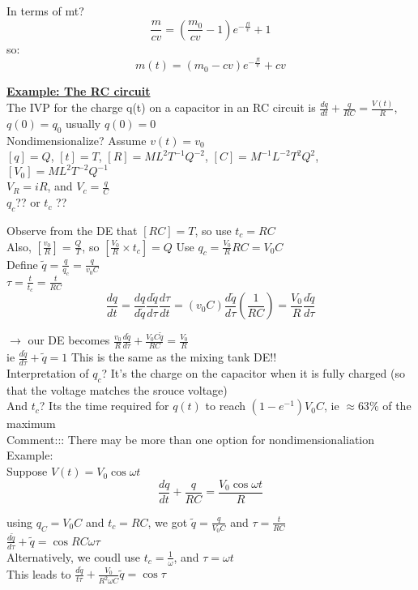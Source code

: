\documentclass[12pt]{article}
\newcommand{\myt}[1]{\textbf{\underline{#1}}}
\begin{document}
	In terms of mt?\\
	$$\frac{m}{cv} = (\frac{m_0}{cv} - 1)e^{-\frac{ft}{v}} + 1$$
	so:\\
	$$m(t) = (m_0 - cv)e^{-\frac{ft}{v}} + cv$$
	
	\myt{Example: The RC circuit}\\
	The IVP for the charge q(t) on a capacitor in an RC circuit is $\frac{dq}{dt} + \frac{q}{RC} = \frac{V(t)}{R}$, $q(0) = q_0$ usually $q(0) = 0$\\
	Nondimensionalize? Assume $v(t) = v_0$\\
	$[q] = Q$, $[t] = T$, $[R] = ML^2T^{-1}Q^{-2}$, $[C] = M^{-1}L^{-2}T^2Q^2$, $[V_0] = ML^{2}T^{-2}Q^{-1}$\\
	$V_R = iR$, and $V_c = \frac{q}{C}$\\
	
	$q_c$?? or $t_c$ ??
	
	Observe from the DE that $[RC] = T$, so use $t_c = RC$\\
	Also, $[\frac{v_0}{R}] = \frac{Q}{T}$, so $[\frac{V_0}{R} \times t_c] = Q$ Use $q_c = \frac{V_0}{R}RC = V_0C$\\
	Define $\tilde{q} = \frac{q}{q_c} = \frac{q}{v_0C}$\\
	$\tau = \frac{t}{t_c} = \frac{t}{RC}$\\
	
	$$\frac{dq}{dt} = \frac{dq}{d\tilde{q}}\frac{d\tilde{q}}{d\tau}\frac{d\tau}{dt} = (v_0C)\frac{d\tilde{q}}{d\tau}(\frac{1}{RC}) = \frac{V_0}{R}\frac{d\tilde{q}}{d\tau}$$
	
	$\rightarrow$ our DE becomes $\frac{v_0}{R}\frac{d\tilde{q}}{d\tau} + \frac{V_0C\tilde{q}}{RC} = \frac{V_0}{R}$\\
	ie $\frac{d\tilde{q}}{d\tau} + \tilde{q} = 1$ This is the same as the mixing tank DE!!\\
	
	Interpretation of $q_c$? It's the charge on the capacitor when it is fully charged (so that the voltage matches the srouce voltage)\\
	And $t_c$? Its the time required for $q(t)$ to reach $(1-e^{-1})V_0C$, ie $\approx 63\%$ of the maximum\\
	
	Comment::: There may be more than one option for nondimensionaliation\\
	
	Example:\\ Suppose $V(t) = V_0\cos{\omega t}$\\
	$$\frac{dq}{dt} + \frac{q}{RC} = \frac{V_0\cos{\omega t}}{R}$$
	
	using $q_C = V_0C$ and $t_c = RC$, we got $\tilde{q} = \frac{q}{V_0C}$ and $\tau = \frac{t}{RC}$\\
	$\frac{d\tilde{q}}{d\tau} + \tilde{q} = \cos{RC\omega \tau}$\\
	Alternatively, we coudl use $t_c = \frac{1}{\omega}$, and $\tau = \omega t$\\
	
	This leads to $\frac{d\tilde{q}}{t\tau} + \frac{V_0}{R^2\omega C}\tilde{q} = \cos{\tau}$\\
	
\end{document}
